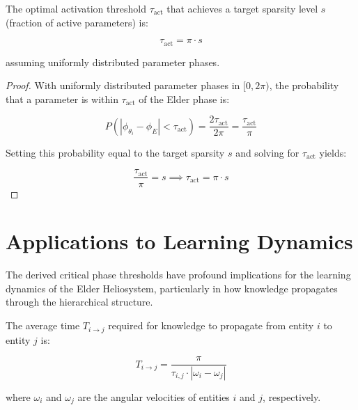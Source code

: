 \begin{theorem}
The optimal activation threshold $\tau_{\text{act}}$ that achieves a target sparsity level $s$ (fraction of active parameters) is:

\begin{equation}
\tau_{\text{act}} = \pi \cdot s
\end{equation}

assuming uniformly distributed parameter phases.
\end{theorem}

\begin{proof}
With uniformly distributed parameter phases in $[0, 2\pi)$, the probability that a parameter is within $\tau_{\text{act}}$ of the Elder phase is:

\begin{equation}
P(|\phi_{\theta_i} - \phi_E| < \tau_{\text{act}}) = \frac{2\tau_{\text{act}}}{2\pi} = \frac{\tau_{\text{act}}}{\pi}
\end{equation}

Setting this probability equal to the target sparsity $s$ and solving for $\tau_{\text{act}}$ yields:

\begin{equation}
\frac{\tau_{\text{act}}}{\pi} = s \implies \tau_{\text{act}} = \pi \cdot s
\end{equation}
\end{proof}

\section{Applications to Learning Dynamics}

The derived critical phase thresholds have profound implications for the learning dynamics of the Elder Heliosystem, particularly in how knowledge propagates through the hierarchical structure.

\begin{theorem}
The average time $T_{i \to j}$ required for knowledge to propagate from entity $i$ to entity $j$ is:

\begin{equation}
T_{i \to j} = \frac{\pi}{\tau_{i,j} \cdot |\omega_i - \omega_j|}
\end{equation}

where $\omega_i$ and $\omega_j$ are the angular velocities of entities $i$ and $j$, respectively.
\end{theorem}

